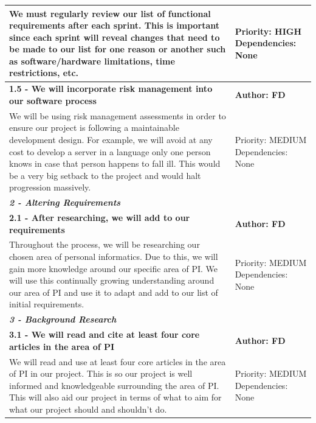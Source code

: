 \documentclass[11pt]{report}
\begin{document}
\begin{center}
\begin{longtable}{| p{13cm} | p{3cm} |}
\hline
We must regularly review our list of functional requirements after each sprint. This is important since each sprint will reveal changes that need to be made to our list for one reason or another such as software/hardware limitations, time restrictions, etc.&Priority: HIGH Dependencies: None\\
\hline
\textbf{1.5 - We will incorporate risk management into our software process} & \textbf{Author: FD} \\
\hline
We will be using risk management assessments in order to ensure our project is following a maintainable development design. For example, we will avoid at any cost to develop a server in a language only one person knows in case that person happens to fall ill. This would be a very big setback to the project and would halt progression massively.&Priority: MEDIUM Dependencies: None\\
\hline

\multicolumn{2}{|l|}{\textbf{\textit{2 - Altering Requirements}}} \\
\hline
\textbf{2.1 - After researching, we will add to our requirements} & \textbf{Author: FD} \\
\hline
Throughout the process, we will be researching our chosen area of personal informatics. Due to this, we will gain more knowledge around our specific area of PI. We will use this continually growing understanding around our area of PI and use it to adapt and add to our list of initial requirements.&Priority: MEDIUM Dependencies: None\\
\hline

\multicolumn{2}{|l|}{\textbf{\textit{3 - Background Research}}} \\
\hline
\textbf{3.1 - We will read and cite at least four core articles in the area of PI} & \textbf{Author: FD} \\
\hline
We will read and use at least four core articles in the area of PI in our project. This is so our project is well informed and knowledgeable surrounding the area of PI. This will also aid our project in terms of what to aim for what our project should and shouldn’t do.&Priority: MEDIUM Dependencies: None\\
\hline


\end{longtable}
\end{center}
\end{document}
